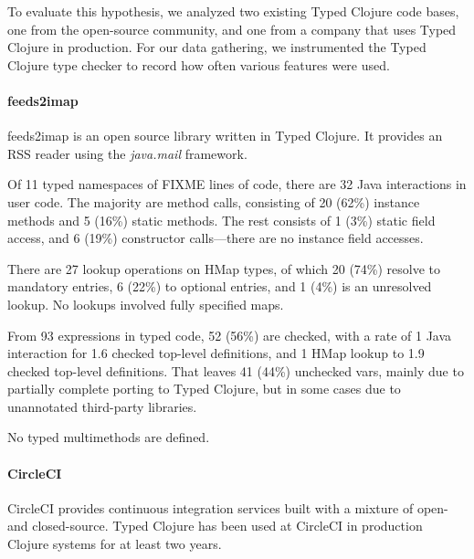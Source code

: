 To evaluate this hypothesis, we analyzed two existing Typed Clojure
code bases, one from the open-source community, and one from a company
that uses Typed Clojure in production. For our data gathering, we
instrumented the Typed Clojure type checker to record how often
various features were used. 

\paragraph{feeds2imap}
feeds2imap is an open source library written in Typed Clojure. It provides an
RSS reader using the \emph{java.mail} framework.

Of 11 typed namespaces of FIXME lines of code,
there are 32 Java interactions in user code. 
The majority are method calls, consisting of 
20 (62\%) instance methods and 5 (16\%) static methods.
The rest consists of 1 (3\%) static field access, and
6 (19\%) constructor calls---there are no instance field
accesses.

There are 27 lookup operations on HMap types, of which 20 (74\%) resolve to
mandatory entries, 6 (22\%) to optional entries,
and 1 (4\%) is an unresolved lookup. 
No lookups involved fully specified maps.

From 93  expressions in typed code, 52 (56\%) are checked,
with a rate of 1
Java interaction for 1.6 checked top-level definitions, and
1 HMap lookup to 1.9 checked top-level definitions.
That leaves 41 (44\%) unchecked vars, mainly due to partially complete 
porting to Typed Clojure, but in some cases due to unannotated third-party 
libraries.

No typed multimethods are defined. 

\paragraph{CircleCI}
CircleCI %
provides continuous integration services built with a mixture of open-
and closed-source.
Typed Clojure has been used at CircleCI in production Clojure systems for at least two years.

